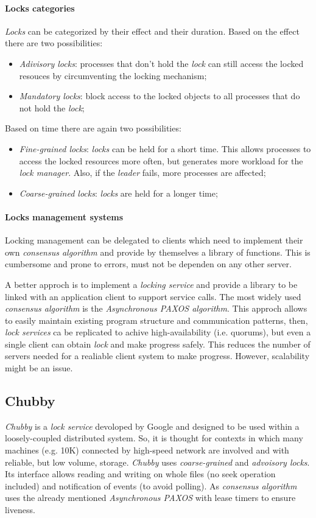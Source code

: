 \paragraph{Locks categories}
\emph{Locks} can be categorized by their effect and their duration. Based on
the effect there are two possibilities:
\begin{itemize}
    \item \emph{Adivisory locks}: processes that don't hold the \emph{lock} can
    still access the locked resouces by circumventing the locking mechanism;
    \item \emph{Mandatory locks}: block access to the locked objects to all
    processes that do not hold the \emph{lock};
\end{itemize}
Based on time there are again two possibilities:
\begin{itemize}
    \item \emph{Fine-grained locks}: \emph{locks} can be held for a short time.
    This allows processes to access the locked resources more often, but
    generates more workload for the \emph{lock manager}. Also, if the
    \emph{leader} fails, more processes are affected;
    \item \emph{Coarse-grained locks}: \emph{locks} are held for a longer time;
\end{itemize}

\paragraph{Locks management systems}
Locking management can be delegated to clients which need to implement their
own \emph{consensus algorithm} and provide by themselves a library of functions.
This is cumbersome and prone to errors, must not be dependen on any other server.

A better approch is to implement a \emph{locking service} and provide a library
to be linked with an application client to support service calls. The most
widely used \emph{consensus algorithm} is the \emph{Asynchronous PAXOS
algorithm}. This approch allows to easily maintain existing program structure
and communication patterns, then, \emph{lock services} ca be replicated to
achive high-availability (i.e. quorums), but even a single client can obtain
\emph{lock} and make progress safely. This reduces the number of servers
needed for a realiable client system to make progress. However, scalability
might be an issue.

\subsection{Chubby}
\emph{Chubby} is a \emph{lock service} devoloped by Google and designed to be used
within a loosely-coupled distributed system. So, it is thought for contexts in
which many machines (e.g. 10K) connected by high-speed network are involved and
with reliable, but low volume, storage. \emph{Chubby} uses \emph{coarse-grained}
and \emph{advoisory locks}. Its interface allows reading and writing on whole
files (no seek operation included) and notification of events (to avoid polling).
As \emph{consensus algorithm} uses the already mentioned \emph{Asynchronous
PAXOS} with lease timers to ensure liveness.


